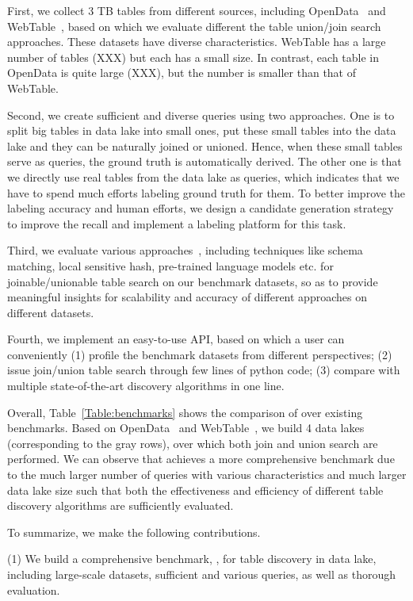  First, we collect 3 TB tables from different sources, including OpenData~\cite{} and  WebTable~\cite{}, based on which we evaluate different the table union/join search approaches. These datasets have diverse characteristics. WebTable has a large number of tables (XXX) but each has a small size. In contrast, each table in OpenData is quite large (XXX), but the number is smaller than that of WebTable. 
 
 
Second, we create sufficient and diverse queries using two approaches. 
One is to split big tables in data lake into small ones, put these small tables into the data lake and they can be naturally joined or unioned. Hence, when these small tables serve as queries, the ground truth is automatically derived. 
The other one is that we directly use real tables from the data lake as queries, which indicates that we have to spend much efforts labeling ground truth for them.
To better improve the labeling accuracy and human efforts, we design a candidate generation strategy to improve the recall and implement a labeling platform for this task.   

Third, we evaluate various approaches~\cc{\cite{}}, including techniques like schema matching, local sensitive hash,  pre-trained language models etc. for joinable/unionable table search on our benchmark datasets, so as to provide meaningful insights for scalability and accuracy of different approaches on different datasets.

Fourth, we implement an easy-to-use API, based on which a user can conveniently (1) profile the benchmark datasets from different perspectives;
(2) issue join/union table search through few lines of python code;
(3) compare with multiple state-of-the-art discovery algorithms in one line.  

Overall, Table~\ref{Table:benchmarks} shows the comparison of \sys over existing benchmarks. Based on OpenData~\cite{} and  WebTable~\cite{}, we build 4 data lakes (corresponding to the gray rows), over which  both join and union search are performed. We can observe that \sys achieves a more comprehensive benchmark due to the much larger number of queries with various characteristics and  much larger data lake size such that both the effectiveness and efficiency of different table discovery algorithms are sufficiently evaluated. 

To summarize, we make the following contributions.

\noindent (1) We build a comprehensive benchmark, \sys, for table discovery in data lake, including large-scale datasets, sufficient and various queries, as well as thorough evaluation.  

